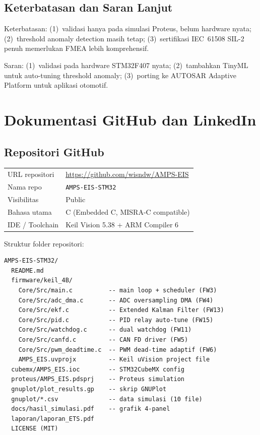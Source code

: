 \documentclass[12pt,a4paper]{article}
\begin{document}
\subsection{Keterbatasan dan Saran Lanjut}

Keterbatasan: (1)~validasi hanya pada simulasi Proteus, belum hardware
nyata; (2)~threshold anomaly detection masih tetap; (3)~sertifikasi
IEC~61508 SIL-2 penuh memerlukan FMEA lebih komprehensif.

Saran: (1)~validasi pada hardware STM32F407 nyata; (2)~tambahkan
TinyML untuk auto-tuning threshold anomaly; (3)~porting ke AUTOSAR
Adaptive Platform untuk aplikasi otomotif.

\newpage
\section{Dokumentasi GitHub dan LinkedIn}
\label{sec:docs}

\subsection{Repositori GitHub}

\begin{table}[H]
\centering
\begin{tabularx}{\textwidth}{@{} l X @{}}
\toprule
URL repositori  & \url{https://github.com/wisndw/AMPS-EIS}\\
Nama repo       & \texttt{AMPS-EIS-STM32}\\
Visibilitas     & Public\\
Bahasa utama    & C (Embedded C, MISRA-C compatible)\\
IDE / Toolchain & Keil \textmu{}Vision 5.38 + ARM Compiler 6\\
\bottomrule
\end{tabularx}
\end{table}

Struktur folder repositori:
\begin{verbatim}
AMPS-EIS-STM32/
  README.md
  firmware/keil_4B/
    Core/Src/main.c          -- main loop + scheduler (FW3)
    Core/Src/adc_dma.c       -- ADC oversampling DMA (FW4)
    Core/Src/ekf.c           -- Extended Kalman Filter (FW13)
    Core/Src/pid.c           -- PID relay auto-tune (FW15)
    Core/Src/watchdog.c      -- dual watchdog (FW11)
    Core/Src/canfd.c         -- CAN FD driver (FW5)
    Core/Src/pwm_deadtime.c  -- PWM dead-time adaptif (FW6)
    AMPS_EIS.uvprojx         -- Keil uVision project file
  cubemx/AMPS_EIS.ioc        -- STM32CubeMX config
  proteus/AMPS_EIS.pdsprj    -- Proteus simulation
  gnuplot/plot_results.gp    -- skrip GNUPlot
  gnuplot/*.csv              -- data simulasi (10 file)
  docs/hasil_simulasi.pdf    -- grafik 4-panel
  laporan/laporan_ETS.pdf
  LICENSE (MIT)
\end{verbatim}
\end{document}
